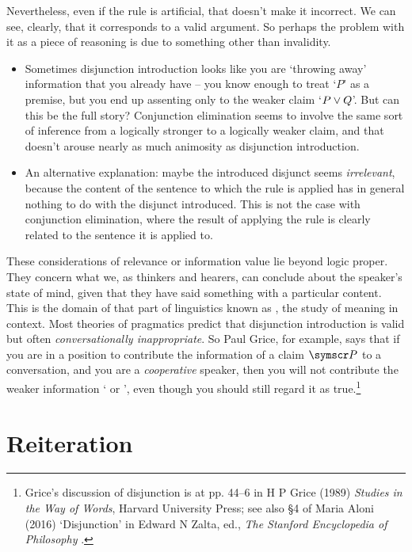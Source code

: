 Nevertheless, even if the rule is artificial, that doesn't make it incorrect. We can see, clearly, that it corresponds to a valid argument. So perhaps the problem with it as a piece of reasoning is due to something other than invalidity. \begin{itemize}
    	\item Sometimes disjunction introduction looks like you are `throwing away' information that you already have – you know enough to treat `$P$' as a premise, but you end up assenting only to the weaker claim `$P \vee Q$'. But can this be the full story? Conjunction elimination seems to involve the same sort of inference from a logically stronger to a logically weaker claim, and that doesn't arouse nearly as much animosity as disjunction introduction. 
	\item An alternative explanation: maybe the introduced disjunct seems \emph{irrelevant}, because the content of the sentence to which the rule is applied has in general nothing to do with the disjunct introduced. This is not the case with conjunction elimination, where the result of applying the rule is clearly related to the sentence it is applied to.
    		\end{itemize} 
These considerations of relevance or information value lie beyond logic proper. They concern what we, as thinkers and hearers, can conclude about the speaker's state of mind, given that they have said something with a particular content. This is the domain of that part of linguistics known as , the study of meaning in context. Most theories of pragmatics predict that disjunction introduction is valid but often \emph{conversationally inappropriate}. So Paul Grice, for example, says that if you are in a position to contribute the information of a claim $\meta{P}$ to a conversation, and you are a \emph{cooperative} speaker, then you will not contribute the weaker information ` or ', even though you should still regard it as true.\footnote{Grice's discussion of disjunction is at pp. 44–6 in H P Grice (1989) \emph{Studies in the Way of Words}, Harvard University Press; see also §4 of Maria Aloni (2016) `Disjunction' in Edward N Zalta, ed., \emph{The Stanford Encyclopedia of Philosophy} .}

\section{Reiteration}\label{reit}

